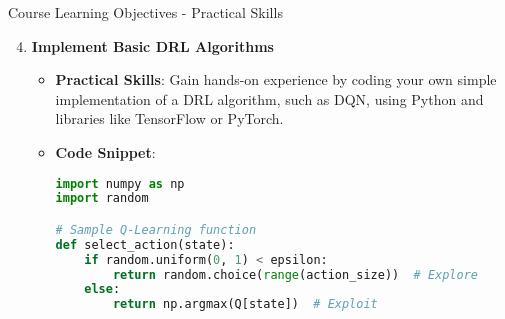 \documentclass[aspectratio=169]{beamer}
\begin{document}
\begin{frame}[fragile]{Course Learning Objectives - Practical Skills}
    \begin{enumerate}
        \setcounter{enumi}{3}
        \item \textbf{Implement Basic DRL Algorithms}
            \begin{itemize}
                \item \textbf{Practical Skills}: Gain hands-on experience by coding your own simple implementation of a DRL algorithm, such as DQN, using Python and libraries like TensorFlow or PyTorch.
                \item \textbf{Code Snippet}:
                \begin{lstlisting}[language=Python]
import numpy as np
import random

# Sample Q-Learning function
def select_action(state):
    if random.uniform(0, 1) < epsilon:
        return random.choice(range(action_size))  # Explore
    else:
        return np.argmax(Q[state])  # Exploit
                \end{lstlisting}
            \end{itemize}
    \end{enumerate}
\end{frame}
\end{document}
